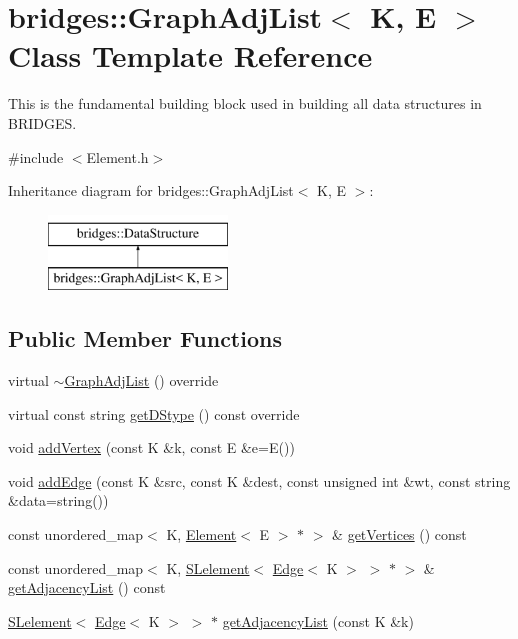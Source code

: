 \hypertarget{classbridges_1_1_graph_adj_list}{}\section{bridges\+:\+:Graph\+Adj\+List$<$ K, E $>$ Class Template Reference}
\label{classbridges_1_1_graph_adj_list}


This is the fundamental building block used in building all data structures in B\+R\+I\+D\+G\+ES.  




{\ttfamily \#include $<$Element.\+h$>$}

Inheritance diagram for bridges\+:\+:Graph\+Adj\+List$<$ K, E $>$\+:\begin{figure}[H]
\begin{center}
\leavevmode
\includegraphics[height=2.000000cm]{classbridges_1_1_graph_adj_list}
\end{center}
\end{figure}
\subsection*{Public Member Functions}
\begin{DoxyCompactItemize}
\item 
virtual \hyperlink{classbridges_1_1_graph_adj_list_a72a783f3136b10b5abef0c32364e9ea1}{$\sim$\+Graph\+Adj\+List} () override
\item 
virtual const string \hyperlink{classbridges_1_1_graph_adj_list_af468c62b241894073ab58bed51581b7b}{get\+D\+Stype} () const override
\item 
void \hyperlink{classbridges_1_1_graph_adj_list_a8e97b282f1fc28f1ecda90bf3fc38d76}{add\+Vertex} (const K \&k, const E \&e=E())
\item 
void \hyperlink{classbridges_1_1_graph_adj_list_a0e53ad3b952a149e48e785c55ea2d6f6}{add\+Edge} (const K \&src, const K \&dest, const unsigned int \&wt, const string \&data=string())
\item 
const unordered\+\_\+map$<$ K, \hyperlink{classbridges_1_1_element}{Element}$<$ E $>$ $\ast$ $>$ \& \hyperlink{classbridges_1_1_graph_adj_list_a0fc1d0a9ebe610a5970dfc94642e5ff9}{get\+Vertices} () const
\item 
const unordered\+\_\+map$<$ K, \hyperlink{classbridges_1_1_s_lelement}{S\+Lelement}$<$ \hyperlink{classbridges_1_1_edge}{Edge}$<$ K $>$ $>$ $\ast$ $>$ \& \hyperlink{classbridges_1_1_graph_adj_list_a0214b56d814a13c14c7cd2b7c7f36ee5}{get\+Adjacency\+List} () const
\item 
\hyperlink{classbridges_1_1_s_lelement}{S\+Lelement}$<$ \hyperlink{classbridges_1_1_edge}{Edge}$<$ K $>$ $>$ $\ast$ \hyperlink{classbridges_1_1_graph_adj_list_aff1124f9e9cc3d86a44c7cd62bd929b1}{get\+Adjacency\+List} (const K \&k)
\end{DoxyCompactItemize}


